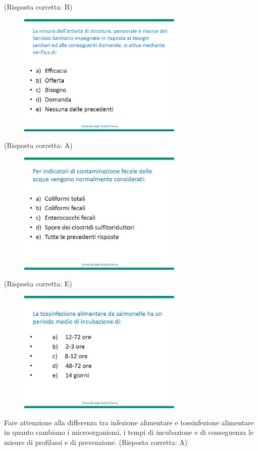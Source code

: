 (Risposta corretta: B)

\begin{figure}[!ht]
\centering
	\includegraphics[width=0.7\textwidth]{25/image9.png}
	\end{figure}

(Risposta corretta: A)

\begin{figure}[!ht]
\centering
	\includegraphics[width=0.7\textwidth]{25/image10.jpeg}
	\end{figure}

(Risposta corretta: E)

\begin{figure}[!ht]
\centering
	\includegraphics[width=0.7\textwidth]{25/image11.jpeg}
	\end{figure}

Fare attenzione alla differenza tra infezione alimentare e tossinfezione
alimentare in quanto cambiano i microorganismi, i tempi di incubazione e
di conseguenza le misure di profilassi e di prevenzione. (Risposta
corretta: A)
